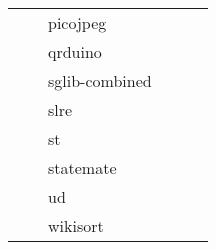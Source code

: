 \documentclass[../bachelor_paper.tex]{subfiles}
\begin{document}
\begin{table}
\begin{tabular}{llllll}
                            &                   & picojpeg          &                   &                   \\
                            &                   & qrduino           &                   &                   \\
                            &                   & sglib-combined    &                   &                   \\
                            &                   & slre              &                   &                   \\
                            &                   & st                &                   &                   \\
                            &                   & statemate         &                   &                   \\
                            &                   & ud                &                   &                   \\
                            &                   & wikisort          &                   &
    \end{tabular}
    \label{tab:bench/sum/run}
\end{table}

\isstandalone



\fi
\end{document}
